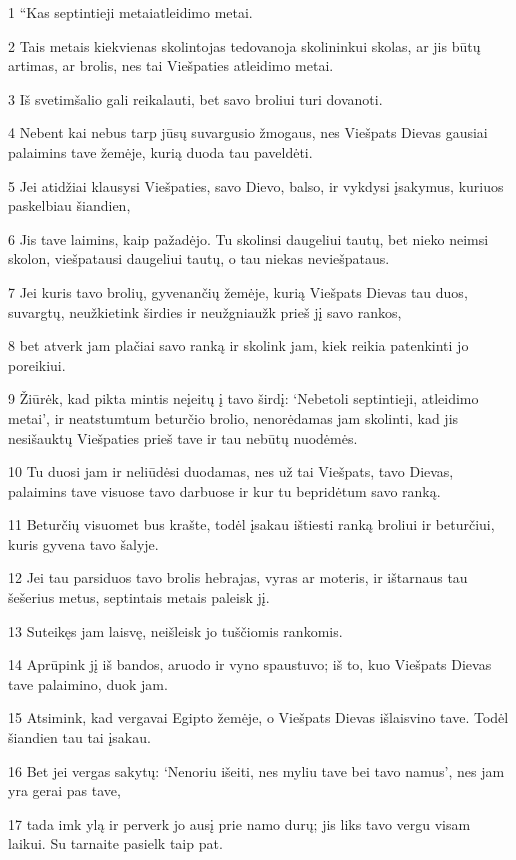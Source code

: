 \par 1 “Kas septintieji metai­atleidimo metai. 
\par 2 Tais metais kiekvienas skolintojas tedovanoja skolininkui skolas, ar jis būtų artimas, ar brolis, nes tai Viešpaties atleidimo metai. 
\par 3 Iš svetimšalio gali reikalauti, bet savo broliui turi dovanoti. 
\par 4 Nebent kai nebus tarp jūsų suvargusio žmogaus, nes Viešpats Dievas gausiai palaimins tave žemėje, kurią duoda tau paveldėti. 
\par 5 Jei atidžiai klausysi Viešpaties, savo Dievo, balso, ir vykdysi įsakymus, kuriuos paskelbiau šiandien, 
\par 6 Jis tave laimins, kaip pažadėjo. Tu skolinsi daugeliui tautų, bet nieko neimsi skolon, viešpatausi daugeliui tautų, o tau niekas neviešpataus. 
\par 7 Jei kuris tavo brolių, gyvenančių žemėje, kurią Viešpats Dievas tau duos, suvargtų, neužkietink širdies ir neužgniaužk prieš jį savo rankos, 
\par 8 bet atverk jam plačiai savo ranką ir skolink jam, kiek reikia patenkinti jo poreikiui. 
\par 9 Žiūrėk, kad pikta mintis neįeitų į tavo širdį: ‘Nebetoli septintieji, atleidimo metai’, ir neatstumtum beturčio brolio, nenorėdamas jam skolinti, kad jis nesišauktų Viešpaties prieš tave ir tau nebūtų nuodėmės. 
\par 10 Tu duosi jam ir neliūdėsi duodamas, nes už tai Viešpats, tavo Dievas, palaimins tave visuose tavo darbuose ir kur tu bepridėtum savo ranką. 
\par 11 Beturčių visuomet bus krašte, todėl įsakau ištiesti ranką broliui ir beturčiui, kuris gyvena tavo šalyje. 
\par 12 Jei tau parsiduos tavo brolis hebrajas, vyras ar moteris, ir ištarnaus tau šešerius metus, septintais metais paleisk jį. 
\par 13 Suteikęs jam laisvę, neišleisk jo tuščiomis rankomis. 
\par 14 Aprūpink jį iš bandos, aruodo ir vyno spaustuvo; iš to, kuo Viešpats Dievas tave palaimino, duok jam. 
\par 15 Atsimink, kad vergavai Egipto žemėje, o Viešpats Dievas išlaisvino tave. Todėl šiandien tau tai įsakau. 
\par 16 Bet jei vergas sakytų: ‘Nenoriu išeiti, nes myliu tave bei tavo namus’, nes jam yra gerai pas tave, 
\par 17 tada imk ylą ir perverk jo ausį prie namo durų; jis liks tavo vergu visam laikui. Su tarnaite pasielk taip pat. 
